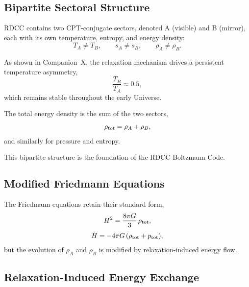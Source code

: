 \documentclass[11pt,a4paper]{article}
\begin{document}
\subsection{Bipartite Sectoral Structure}

RDCC contains two CPT-conjugate sectors, denoted A (visible) and B (mirror), each with its own temperature, entropy, and energy density:
\begin{equation}
T_A \neq T_B, \qquad s_A \neq s_B, \qquad \rho_A \neq \rho_B.
\end{equation}

As shown in Companion~X, the relaxation mechanism drives a persistent temperature asymmetry,
\begin{equation}
\frac{T_B}{T_A} \approx 0.5,
\end{equation}
which remains stable throughout the early Universe.

The total energy density is the sum of the two sectors,
\begin{equation}
\rho_{\rm tot} = \rho_A + \rho_B,
\end{equation}
and similarly for pressure and entropy.

This bipartite structure is the foundation of the RDCC Boltzmann Code.

\subsection{Modified Friedmann Equations}

The Friedmann equations retain their standard form,
\begin{equation}
H^2 = \frac{8\pi G}{3}\,\rho_{\rm tot},
\end{equation}
\begin{equation}
\dot{H} = -4\pi G\,(\rho_{\rm tot} + p_{\rm tot}),
\end{equation}
but the evolution of $\rho_A$ and $\rho_B$ is modified by relaxation-induced energy flow.

\subsection{Relaxation-Induced Energy Exchange}
\end{document}
